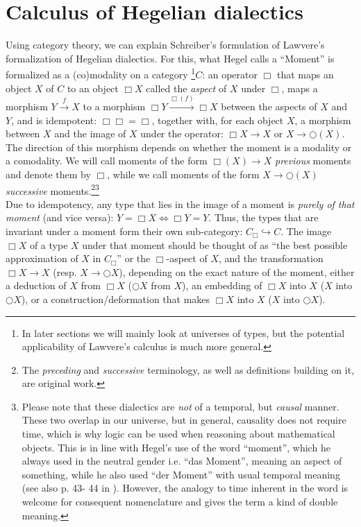\documentclass{article}
\begin{document}
\section{Calculus of Hegelian dialectics}
Using category theory, we can explain Schreiber's formulation of Lawvere's formalization of Hegelian dialectics.
For this, what Hegel calls a ``Moment'' is formalized as a (co)modality on a category \footnote{In later
sections we will mainly look at universes of types, but the potential applicability of Lawvere's calculus
is much more general.}$C$: an operator $\Box$ that maps an object $X$ of $C$ to an object $\Box X$ called
the \emph{aspect} of $X$ under $\Box$, maps a morphism $Y\xrightarrow{f} X$ to a morphism $\Box Y\xrightarrow{\Box(f)}\Box
X$ between the aspects of $X$ and $Y$, and is idempotent: $\Box\Box =\Box$, together with, for each object $X$, a morphism between $X$ and
the image of $X$ under the operator: $\Box X\rightarrow X$ or $X\rightarrow \bigcirc(X)$. The direction
of this morphism depends on whether the moment is a modality or a comodality. We will call moments of the
form $\Box(X)\rightarrow X$ \emph{previous} moments and denote them by $\Box$, while we call moments of
the form $X\rightarrow \bigcirc(X)$ \emph{successive} moments.\footnote{The \emph{preceding} and \emph{successive}
terminology, as well as definitions building on it, are original work.}\footnote{Please note that these
dialectics are \emph{not} of a temporal, but \emph{causal} manner. These two overlap in our universe,
but in general, causality does not require time, which is why logic can be used when reasoning about mathematical
objects. This is in line with Hegel's use of the word  ``moment'', which he always used in the neutral
gender i.e. ``das Moment'', meaning an aspect of something, while he also used ``der Moment'' with usual
temporal meaning (see also p. 43- 44 in \cite{Kli}). However, the analogy to time inherent in the word
is welcome for consequent nomenclature and gives the term a kind of double meaning.} \\

Due to idempotency, any type that lies in the image of a moment is \emph{purely of that moment} (and vice
versa): $Y=\Box X \Leftrightarrow \Box Y =Y$. Thus, the types that are invariant under a moment form their
own sub-category: $C_\Box\hookrightarrow C$. The image $\Box X $ of a type $X$ under that moment should
be thought of as ``the best possible approximation of $X$ in $C_\Box$'' or the $\Box$-aspect of $X$, and
the transformation $\Box X \rightarrow X$ (resp. $X\rightarrow \bigcirc X$), depending on the exact nature
of the moment, either a deduction of $X$ from $\Box  X $ ($\bigcirc X $ from $X$), an embedding of $\Box
X $ into $X$ ($X$ into 
$\bigcirc X$), or a construction/deformation that makes $\Box X$ into $X$ ($X$ into $\bigcirc X$). \\
\end{document}
